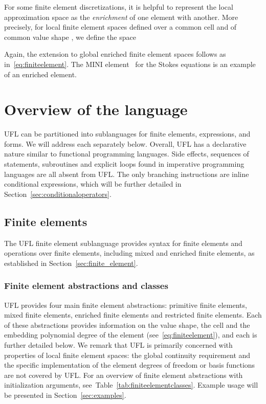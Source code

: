 \documentclass[prodmode,acmtoms]{acmsmall}
\begin{document}
For some finite element discretizations, it is helpful to represent
the local approximation space as the \emph{enrichment} of one element
with another. More precisely, for local finite element spaces
 defined over a
common cell  and of common value shape , we define the space

Again, the extension to global enriched finite element spaces follows
as in~\eqref{eq:finiteelement}. The MINI
element~\citep{ArnoldBrezziFortin1984} for the Stokes equations is an
example of an enriched element.

\section{Overview of the language}
\label{sec:language}

UFL can be partitioned into sublanguages for finite elements, expressions,
and forms. We will address each separately below. Overall, UFL has a
declarative nature similar to functional programming languages. Side
effects, sequences of statements, subroutines and explicit loops
found in imperative programming languages are all absent from UFL. The
only branching instructions are inline conditional expressions, which
will be further detailed in Section~\ref{sec:conditionaloperators}.

\subsection{Finite elements}
\label{sec:function_spaces}

The UFL finite element sublanguage provides syntax for finite
elements and operations over finite elements, including mixed and
enriched finite elements, as established in
Section~\ref{sec:finite_element}.

\subsubsection{Finite element abstractions and classes}

UFL provides four main finite element abstractions: primitive finite
elements, mixed finite elements, enriched finite elements and
restricted finite elements. Each of these abstractions provides
information on the value shape, the cell and the embedding polynomial
degree of the element (see~\eqref{eq:finiteelement}), and each is
further detailed below. We remark that UFL is primarily concerned with
properties of local finite element spaces: the global continuity
requirement and the specific implementation of the element degrees of
freedom or basis functions are not covered by UFL. For an overview of
finite element abstractions with initialization arguments,
see~Table~\ref{tab:finiteelementclasses}. Example usage will be
presented in Section~\ref{sec:examples}.
\end{document}
